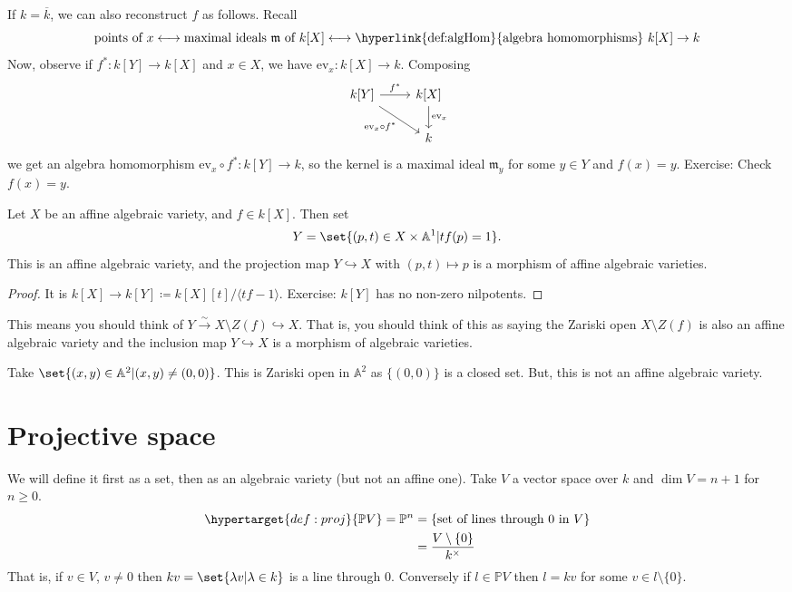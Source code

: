 \documentclass{article}
\newcommand{\A}{\mathbb{A}}
\begin{document}

If $k = \overline{k}$, we can also reconstruct $f$ as follows.
Recall
\begin{equation*}\text{points of }x \longleftrightarrow \text{maximal ideals }\mathfrak{m} \text{ of } k[X] \longleftrightarrow \text{\hyperlink{def:algHom}{algebra homomorphisms} }k[X] \to k\end{equation*}
Now, observe if $f^* : k[Y] \to k[X]$ and $x \in X$, we have $\text{ev}_x: k[X] \to k$.
Composing
\begin{equation*}
    \begin{tikzcd}
        k[Y] \rar["f^*"] \drar["\text{ev}_x \circ f^*"'] & k[X] \dar["\text{ev}_x"] \\ & k
    \end{tikzcd}
\end{equation*}
we get an algebra homomorphism $\text{ev}_x \circ f^* : k[Y] \to k$, so the kernel is a maximal ideal $\mathfrak{m}_y$ for some $y \in Y$ and $f(x) = y$.
Exercise: Check $f(x) = y$.

\begin{prop}
    Let $X$ be an affine algebraic variety, and $f \in k[X]$.  Then set \begin{equation*}Y = \set{(p, t) \in X \times \A^1 | t f(p) = 1}.\end{equation*}
    This is an affine algebraic variety, and the projection map $Y \hookrightarrow X$ with $(p, t) \mapsto p$ is a morphism of affine algebraic varieties.
\end{prop}
\begin{proof}
    It is $k[X] \to k[Y] \coloneqq k[X][t]/\langle tf-1 \rangle$. Exercise: $k[Y]$ has no non-zero nilpotents.
\end{proof}
This means you should think of $Y \xrightarrow{\sim} X \setminus Z(f) \hookrightarrow X$.
That is, you should think of this as saying the Zariski open $X \setminus Z(f)$ is also an affine algebraic variety and the inclusion map $Y \hookrightarrow X$ is a morphism of algebraic varieties.

\begin{warning}
    Take $\set{(x, y) \in \A^2 | (x, y) \neq (0, 0)}$. This is Zariski open in $\A^2$ as $\{(0, 0)\}$ is a closed set. But, this is not an affine algebraic variety.
\end{warning}

\clearpage
\section{Projective space}
We will define it first as a set, then as an algebraic variety (but not an affine one).
Take $V$ a vector space over $k$ and $\dim V = n+1$ for $n \geq 0$.
\begin{align*}
    \hypertarget{def:proj}{\mathbb{P}V} = \mathbb{P}^n &= \{\text{set of lines through } 0 \text{ in } V\} \\
                                                       &= {V \setminus \{0\} \over k^\times}
\end{align*}
That is, if $v \in V$, $v \neq 0$ then $k v = \set{\lambda v | \lambda \in k}$ is a line through $0$.
Conversely if $l \in \mathbb{P}V$ then $l = kv$ for some $v \in l \setminus \{0\}$.
\end{document}
